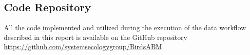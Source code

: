 %
%
%


\clearpage
\appendix
\begin{appendices}
    \section{Code Repository}
    \label{sec:code-repo}

    All the code implemented and utilized during the execution of the data workflow described in this report is available on the GitHub repository \href{https://github.com/systemsecologygroup/BirdsABM}{https://github.com/systemsecologygroup/BirdsABM}.

\end{appendices}
